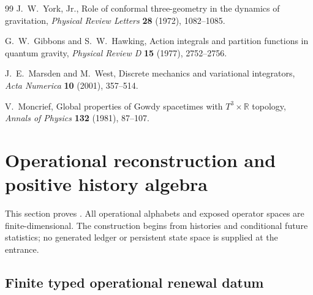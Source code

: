 \documentclass[11pt]{article}
\theoremstyle{definition}
\theoremstyle{remark}
\begin{document}
\begin{thebibliography}{99}
J.~W.~York, Jr.,
\newblock Role of conformal three-geometry in the dynamics of gravitation,
\newblock \emph{Physical Review Letters} \textbf{28} (1972), 1082--1085.

G.~W.~Gibbons and S.~W.~Hawking,
\newblock Action integrals and partition functions in quantum gravity,
\newblock \emph{Physical Review D} \textbf{15} (1977), 2752--2756.

J.~E.~Marsden and M.~West,
\newblock Discrete mechanics and variational integrators,
\newblock \emph{Acta Numerica} \textbf{10} (2001), 357--514.

V.~Moncrief,
\newblock Global properties of Gowdy spacetimes with $T^3\times\mathbb R$ topology,
\newblock \emph{Annals of Physics} \textbf{132} (1981), 87--107.

\end{thebibliography}



\clearpage
\appendix

\section{Operational reconstruction and positive history algebra}
\label{supp:grand-reconstruction}

This section proves .  All operational alphabets and
exposed operator spaces are finite-dimensional.  The construction begins from
histories and conditional future statistics; no generated ledger or persistent
state space is supplied at the entrance.

\subsection{Finite typed operational renewal datum}
\end{document}
